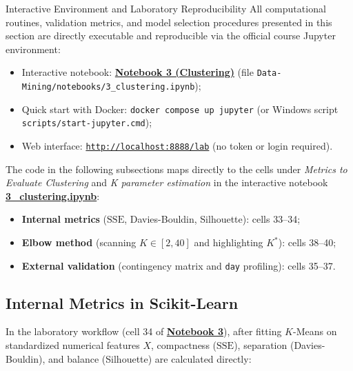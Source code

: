\begin{noteblock}{Interactive Environment and Laboratory Reproducibility}
    All computational routines, validation metrics, and model selection procedures presented in this section are directly executable and reproducible via the official course Jupyter environment:
    \begin{itemize}[noitemsep]
        \item Interactive notebook: \href{http://localhost:8888/lab/tree/notebooks/3_clustering.ipynb}{\textbf{Notebook 3 (Clustering)}} (file \texttt{Data-Mining/notebooks/3\_clustering.ipynb});
        \item Quick start with Docker: \texttt{docker compose up jupyter} (or Windows script \texttt{scripts/start-jupyter.cmd});
        \item Web interface: \href{http://localhost:8888/lab}{\texttt{http://localhost:8888/lab}} (no token or login required).
    \end{itemize}
\end{noteblock}

\begin{remark}
    The code in the following subsections maps directly to the cells under \textit{Metrics to Evaluate Clustering} and \textit{K parameter estimation} in the interactive notebook \href{http://localhost:8888/lab/tree/notebooks/3_clustering.ipynb}{\textbf{3\_clustering.ipynb}}:
    \begin{itemize}[noitemsep]
        \item \textbf{Internal metrics} ($\mathrm{SSE}$, Davies-Bouldin, Silhouette): cells 33--34;
        \item \textbf{Elbow method} (scanning $K \in [2, 40]$ and highlighting $K^*$): cells 38--40;
        \item \textbf{External validation} (contingency matrix and \texttt{day} profiling): cells 35--37.
    \end{itemize}
\end{remark}

\subsection{Internal Metrics in Scikit-Learn}
In the laboratory workflow (cell 34 of \href{http://localhost:8888/lab/tree/notebooks/3_clustering.ipynb}{\textbf{Notebook 3}}), after fitting $K$-Means on standardized numerical features $X$, compactness ($\mathrm{SSE}$), separation (Davies-Bouldin), and balance (Silhouette) are calculated directly:

